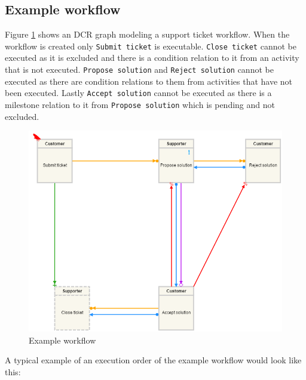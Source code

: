 \documentclass{article}
\begin{document}
	\subsection{Example workflow}
	Figure \ref{fig:exampleWorkflow} shows an DCR graph modeling a support ticket workflow. When the workflow is created only \texttt{Submit ticket} is executable. 
	\texttt{Close ticket} cannot be executed as it is excluded and there is a condition relation to it from an activity that is not executed. 
	\texttt{Propose solution} and \texttt{Reject solution} cannot be executed as there are condition relations to them from activities that have not been executed. 
	Lastly \texttt{Accept solution} cannot be executed as there is a milestone relation to it from \texttt{Propose solution} which is pending and not excluded.
	\begin{figure}[!ht]
		\centering
		\includegraphics[width=\textwidth]{figures/exampleWorkflow.png}
	 	\caption[Example workflow]
	 	{Example workflow}
	 	\label{fig:exampleWorkflow}
	\end{figure}
	\FloatBarrier
	A typical example of an execution order of the example workflow would look like this:
\end{document}

